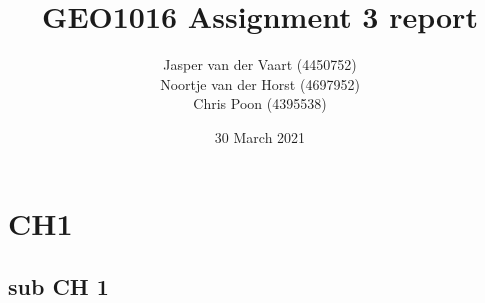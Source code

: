 \documentclass{report}
\title{GEO1016 Assignment 3 report}
\author{Jasper van der Vaart (4450752)\\Noortje van der Horst (4697952)\\Chris Poon (4395538)}
\date{30 March 2021}
\begin{document}
	
\maketitle
	
\section{CH1}

\subsection{sub CH 1}
\end{document}
